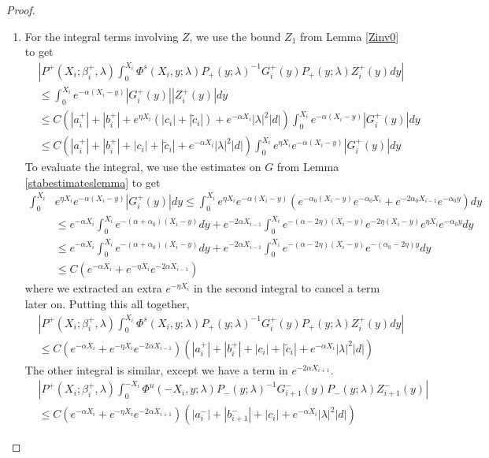 \documentclass[thesis.tex]{subfiles}
\begin{document}
\begin{lemma}
\begin{proof}
\begin{enumerate}
\item For the integral terms involving $Z$, we use the bound $Z_1$ from Lemma \ref{Zinv0} to get
\begin{align*}
&\left|
P^+(X_i; \beta_i^+, \lambda) \int_0^{X_i} \Phi^s(X_i, y; \lambda) P_+(y; \lambda)^{-1} G_i^+(y) P_+(y; \lambda) Z_i^+(y) dy \right| \\
&\leq \int_0^{X_i} e^{-\alpha(X_i - y)} |G_i^+(y)| |Z_i^+(y)| dy \\
&\leq C \left(|a_i^+| + |b_i^+| + e^{\eta X_i}(|c_i| + |\tilde{c}_i|) + e^{-\alpha X_i}|\lambda|^2|d| \right) \int_0^{X_i} e^{-\alpha(X_i - y)} |G_i^+(y)| dy \\
&\leq C \left(|a_i^+| + |b_i^+| + |c_i| + |\tilde{c}_i| + e^{-\alpha X_i}|\lambda|^2|d| \right) \int_0^{X_i}  e^{\eta X_i} e^{-\alpha(X_i - y)} |G_i^+(y)| dy
\end{align*}
To evaluate the integral, we use the estimates on $G$ from Lemma \ref{stabestimateslemma} to get
\begin{align*}
\int_0^{X_i} &e^{\eta X_i} e^{-\alpha(X_i - y)} |G_i^+(y)| dy \leq \int_0^{X_i} e^{\eta X_i} e^{-\alpha(X_i - y)} \left(e^{-\alpha_0(X_i - y)}e^{-\alpha_0 X_i} + e^{-2 \alpha_0 X_{i-1}} e^{-\alpha_0 y} \right) dy \\
&\leq e^{-\alpha X_i} \int_0^{X_i} e^{-(\alpha + \alpha_0)(X_i - y)} dy + e^{-2 \alpha X_{i-1}} \int_0^{X_i} e^{-(\alpha - 2 \eta)(X_i - y)}e^{-2 \eta(X_i - y)}e^{\eta X_i}e^{-\alpha_0 y} dy \\
&\leq e^{-\alpha X_i} \int_0^{X_i} e^{-(\alpha + \alpha_0)(X_i - y)} dy + e^{-2 \alpha X_{i-1}} \int_0^{X_i} e^{-(\alpha - 2\eta)(X_i - y)}e^{-(\alpha_0 - 2 \eta)y} dy \\
&\leq C (e^{-\alpha X_i} + e^{-\eta X_i} e^{-2 \alpha X_{i-1}})
\end{align*}
where we extracted an extra $e^{-\eta X_i}$ in the second integral to cancel a term later on. Putting this all together,
\begin{align*}
&\left|
P^+(X_i; \beta_i^+, \lambda) \int_0^{X_i} \Phi^s(X_i, y; \lambda) P_+(y; \lambda)^{-1} G_i^+(y) P_+(y; \lambda) Z_i^+(y) dy \right| \\
&\leq C (e^{-\alpha X_i} + e^{-\eta X_i} e^{-2 \alpha X_{i-1}}) \left(|a_i^+| + |b_i^+| + |c_i| + |\tilde{c}_i| + e^{-\alpha X_i}|\lambda|^2|d| \right)
\end{align*}
The other integral is similar, except we have a term in $e^{-2 \alpha X_{i+1}}$.
\begin{align*}
&\left|
P^+(X_i; \beta_i^+, \lambda) \int_0^{-X_i} \Phi^u(-X_i, y; \lambda) P_-(y; \lambda)^{-1} G_{i+1}^-(y) P_-(y; \lambda)Z_{i+1}^-(y) \right| \\
&\leq C (e^{-\alpha X_i} + e^{-\eta X_i} e^{-2 \alpha X_{i+1}}) \left(|a_i^-| + |b_{i+1}^-| + |c_i| + e^{-\alpha X_i}|\lambda|^2|d| \right)
\end{align*}


\end{enumerate}
\end{proof}
\end{lemma}
\end{document}
